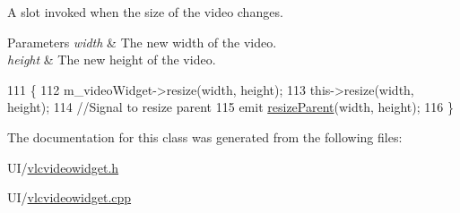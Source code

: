 A slot invoked when the size of the video changes. 


\begin{DoxyParams}{Parameters}
{\em width} & The new width of the video. \\
\hline
{\em height} & The new height of the video. \\
\hline
\end{DoxyParams}

\begin{DoxyCode}
111 \{
112     m\_videoWidget->resize(width, height);
113     this->resize(width, height);
114     \textcolor{comment}{//Signal to resize parent}
115     emit \hyperlink{classVLCVideoWidget_aeff3477d9c077d45b0ff8caea2514150}{resizeParent}(width, height);
116 \}
\end{DoxyCode}


The documentation for this class was generated from the following files\-:\begin{DoxyCompactItemize}
\item 
U\-I/\hyperlink{vlcvideowidget_8h}{vlcvideowidget.\-h}\item 
U\-I/\hyperlink{vlcvideowidget_8cpp}{vlcvideowidget.\-cpp}\end{DoxyCompactItemize}
